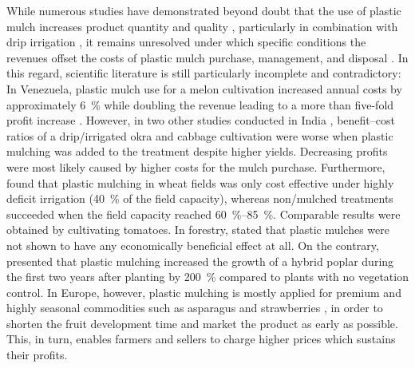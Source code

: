 While numerous studies have demonstrated beyond doubt that the use of plastic mulch increases product quantity and quality \citep[for instance,][]{LaugaleInfluence2015,OverbeckReflective2013, Ruiz-MachucaCultivation2015}, particularly in combination with drip irrigation \citep{BiswasEffect2015,Lopez-LopezWater2015}, it remains unresolved under which specific conditions the revenues offset the costs of plastic mulch purchase, management, and disposal \citep{FisherAlternative1995,MugallaProfitability1996}. In this regard, scientific literature is still particularly incomplete and contradictory: In Venezuela, plastic mulch use for a melon cultivation increased annual costs by approximately \SI{6}{\percent} while doubling the revenue leading to a more than five-fold profit increase \citep{NavaBeneficios2011}. However, in two other studies conducted in India \citep{TiwariResponse1998,TiwariEffect2003}, benefit--cost ratios of a drip\-/irrigated okra and cabbage cultivation were worse when plastic mulching was added to the treatment despite higher yields. Decreasing profits were most likely caused by higher costs for the mulch purchase. Furthermore, \citet{XieEffect2005} found that plastic mulching in wheat fields was only cost effective under highly deficit irrigation (\SI{40}{\percent} of the field capacity), whereas non\-/mulched treatments succeeded when the field capacity reached \SIrange[range-phrase = { to }]{60}{85}{\percent}. Comparable results were obtained by \citet{BiswasEffect2015} cultivating tomatoes. In forestry, \citet{LeclercPaillage1997} stated that plastic mulches were not shown to have any economically beneficial effect at all. On the contrary, \citet{BohleniusExploration2015} presented that plastic mulching increased the growth of a hybrid poplar during the first two years after planting by \SI{200}{\percent} compared to plants with no vegetation control. In Europe, however, plastic mulching is mostly applied for premium and highly seasonal commodities such as asparagus and strawberries \citep{HeissnerComparison2005,StevensHorticultural2011}, in order to shorten the fruit development time and market the product as early as possible. This, in turn, enables farmers and sellers to charge higher prices \citep{JohnsonWeed2005,PolingFrost1991} which sustains their profits.

